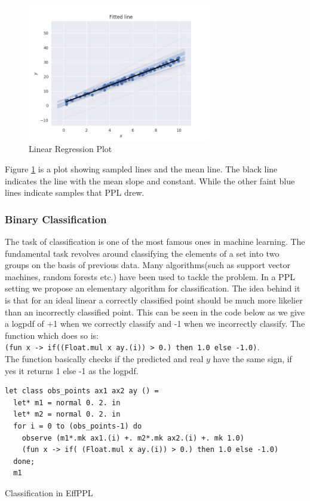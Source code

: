 \documentclass[a4paper,11pt]{article}
\theoremstyle{mytheor}
\begin{document}
\begin{figure}[H]
    \centering
    \includegraphics[width=8cm]{machine_learning/linreg.png}
    \caption{Linear Regression Plot}
    \label{fig:linref}
\end{figure}
   Figure \ref{fig:linref} is a plot showing sampled lines and the mean line. The black line indicates the line with the mean slope and constant. While the other faint blue lines indicate samples that PPL drew. 
    
    
        \subsubsection{Binary Classification}
        
        The task of classification is one of the most famous ones in machine learning. The fundamental task revolves around classifying the elements of a set into two groups on the basis of previous data. Many algorithms(such as support vector machines, random forests etc.) have been used to tackle the problem. In a PPL setting we propose an elementary algorithm for classification. The idea behind it is that for an ideal linear a correctly classified point should be much more likelier than an incorrectly classified point. This can be seen in the code below as we give a logpdf of +1 when we correctly classify and -1 when we incorrectly classify. The function which does so is:\\ \lstinline{(fun x -> if((Float.mul x ay.(i)) > 0.) then 1.0 else -1.0)}.\\
        The function basically checks if the predicted and real $y$ have the same sign, if yes it returns 1 else -1 as the logpdf. 
        
\begin{listing}[H]\centering
\begin{verbatim}
let class obs_points ax1 ax2 ay () =
  let* m1 = normal 0. 2. in 
  let* m2 = normal 0. 2. in 
  for i = 0 to (obs_points-1) do 
    observe (m1*.mk ax1.(i) +. m2*.mk ax2.(i) +. mk 1.0) 
	(fun x -> if( (Float.mul x ay.(i)) > 0.) then 1.0 else -1.0)
  done;
  m1
\end{verbatim}
\caption{Classification in EffPPL}
\end{listing}        
        
\end{document}
